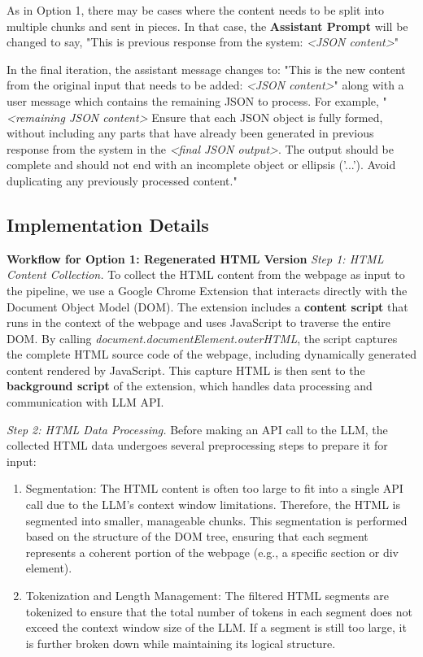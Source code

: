 As in Option 1, there may be cases where the content needs to be split into multiple chunks and sent in pieces. In that case, the \textbf{Assistant Prompt} will be changed to say, "This is previous response from the system: \textit{<JSON content>}"

In the final iteration, the assistant message changes to: "This is the new content from the original input that needs to be added: \textit{<JSON content>}" along with a user message which contains the remaining JSON to process. For example, "\textit{<remaining JSON content>} Ensure that each JSON object is fully formed, without including any parts that have already been generated in previous response from the system in the \textit{<final JSON output>}. The output should be complete and should not end with an incomplete object or ellipsis ('...'). Avoid duplicating any previously processed content."

\subsection{Implementation Details}
\label{sec:imple_detail}
\textbf{Workflow for Option 1: Regenerated HTML Version}
\textit{Step 1: HTML Content Collection.} To collect the HTML content from the webpage as input to the pipeline, we use a Google Chrome Extension that interacts directly with the Document Object Model (DOM). The extension includes a \textbf{content script} that runs in the context of the webpage and uses JavaScript to traverse the entire DOM. By calling \textit{document.documentElement.outerHTML}, the script captures the complete HTML source code of the webpage, including dynamically generated content rendered by JavaScript. This capture HTML is then sent to the \textbf{background script} of the extension, which handles data processing and communication with LLM API.

\textit{Step 2: HTML Data Processing.} Before making an API call to the LLM, the collected HTML data undergoes several preprocessing steps to prepare it for input:
\begin{enumerate}
    \item Segmentation: The HTML content is often too large to fit into a single API call due to the LLM's context window limitations. Therefore, the HTML is segmented into smaller, manageable chunks. This segmentation is performed based on the structure of the DOM tree, ensuring that each segment represents a coherent portion of the webpage (e.g., a specific section or div element).
    \item Tokenization and Length Management: The filtered HTML segments are tokenized to ensure that the total number of tokens in each segment does not exceed the context window size of the LLM. If a segment is still too large, it is further broken down while maintaining its logical structure.
\end{enumerate}

